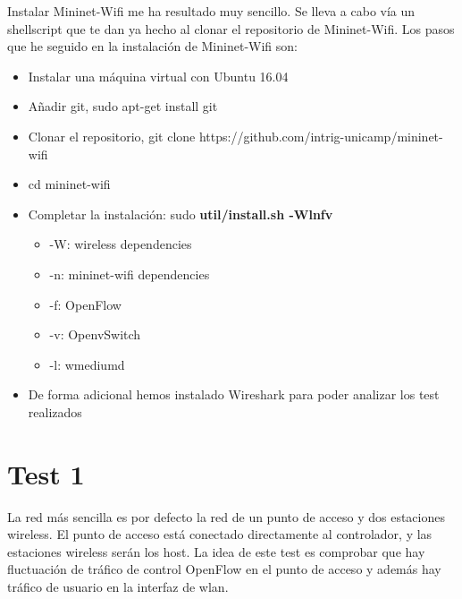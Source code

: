 Instalar Mininet-Wifi me ha resultado muy sencillo. Se lleva a cabo vía un shellscript que te dan ya hecho al clonar el repositorio de Mininet-Wifi. Los pasos que he seguido en la instalación de Mininet-Wifi son:
\begin{itemize}
    \item Instalar una máquina virtual con Ubuntu 16.04
    \item Añadir git, sudo apt-get install git 
    \item Clonar el repositorio, git clone https://github.com/intrig-unicamp/mininet-wifi
    \item cd mininet-wifi
    \item Completar la instalación: sudo \textbf{util/install.sh -Wlnfv}
    \begin{itemize}
        \item -W: wireless dependencies
        \item -n: mininet-wifi dependencies
        \item -f: OpenFlow
        \item -v: OpenvSwitch
        \item -l: wmediumd
    \end{itemize}
    \item De forma adicional hemos instalado Wireshark para poder analizar los test realizados
\end{itemize}

\section{Test 1}
La red más sencilla es por defecto la red de un punto de acceso y dos estaciones wireless. El punto de acceso está conectado directamente al controlador, y las estaciones wireless serán los host. La idea de este test es comprobar que hay fluctuación de tráfico de control OpenFlow en el punto de acceso y además hay tráfico de usuario en la interfaz de wlan.

